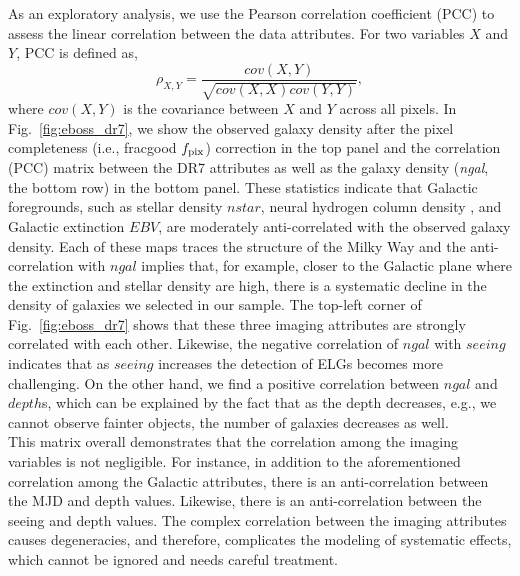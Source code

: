 As an exploratory analysis, we use the Pearson correlation coefficient (PCC) to assess the linear correlation between the data attributes. For two variables $X$ and $Y$, PCC is defined as,
\begin{equation}\label{eq:pcc}
\rho_{X, Y} = \frac{cov(X, Y)}{\sqrt{cov(X,X)cov(Y,Y)}},
\end{equation}
where $cov(X,Y)$ is the covariance between $X$ and $Y$ across all pixels. In Fig.~\ref{fig:eboss_dr7}, we show the observed galaxy density after the pixel completeness (i.e., fracgood $f_{\rm pix}$) correction in the top panel and the correlation (PCC) matrix between the DR7 attributes as well as the galaxy density (\textit{ngal}, the bottom row) in the bottom panel. These statistics indicate that Galactic foregrounds, such as stellar density $nstar$, neural hydrogen column density \lnHI, and Galactic extinction $EBV$, are moderately anti-correlated with the observed galaxy density. Each of these maps traces the structure of the Milky Way and the anti-correlation with $ngal$ implies that, for example, closer to the Galactic plane where the extinction and stellar density are high, there is a systematic decline in the density of galaxies we selected in our sample. The top-left corner of Fig.~\ref{fig:eboss_dr7} shows that these three imaging attributes are strongly correlated with each other. Likewise, the negative correlation of $ngal$ with $seeing$ indicates that as $seeing$ increases the detection of ELGs becomes more challenging. On the other hand, we find a positive correlation between $ngal$ and $depth$s, which can be explained by the fact that as the depth decreases, e.g., we cannot observe fainter objects, the number of galaxies decreases as well.\\

This matrix overall demonstrates that the correlation among the imaging variables is not negligible. For instance, in addition to the aforementioned correlation among the Galactic attributes, there is an anti-correlation between the MJD and depth values. Likewise, there is an anti-correlation between the seeing and depth values. The complex correlation between the imaging attributes causes degeneracies, and therefore, complicates the modeling of systematic effects, which cannot be ignored and needs careful treatment.

